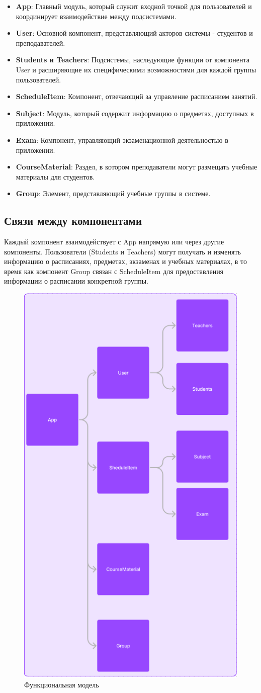 \documentclass[a4paper,12pt]{article}
\begin{document}
\begin{itemize}
    \item \textbf{App}: Главный модуль, который служит входной точкой для пользователей и координирует взаимодействие между подсистемами.
    \item \textbf{User}: Основной компонент, представляющий акторов системы - студентов и преподавателей.
    \item \textbf{Students и Teachers}: Подсистемы, наследующие функции от компонента User и расширяющие их специфическими возможностями для каждой группы пользователей.
    \item \textbf{ScheduleItem}: Компонент, отвечающий за управление расписанием занятий.
    \item \textbf{Subject}: Модуль, который содержит информацию о предметах, доступных в приложении.
    \item \textbf{Exam}: Компонент, управляющий экзаменационной деятельностью в приложении.
    \item \textbf{CourseMaterial}: Раздел, в котором преподаватели могут размещать учебные материалы для студентов.
    \item \textbf{Group}: Элемент, представляющий учебные группы в системе.
\end{itemize}

\subsection{Связи между компонентами}
Каждый компонент взаимодействует с App напрямую или через другие компоненты. Пользователи (Students и Teachers) могут получать и изменять информацию о расписаниях, предметах, экзаменах и учебных материалах, в то время как компонент Group связан с ScheduleItem для предоставления информации о расписании конкретной группы.

\begin{figure}[-h]
    \centering
    \includegraphics[width=0.5\linewidth]{func_diagram_5.png}
    \caption{Функциональная модель}
\end{figure}
\end{document}
